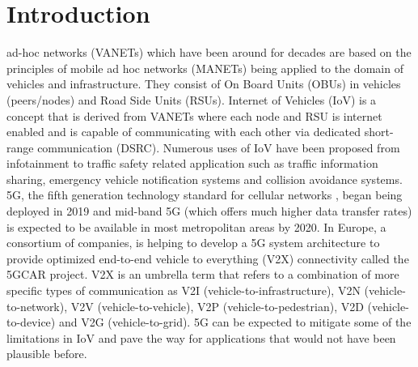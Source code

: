 \documentclass[journal]{IEEEtran}
\begin{document}
%
\IEEEpeerreviewmaketitle



\section{Introduction}

% 
% 
% 
% 
 ad-hoc networks (VANETs) which have been around for decades are based on the principles of mobile ad hoc networks (MANETs) being applied to the domain of vehicles and infrastructure. They consist of On Board Units (OBUs) in vehicles (peers/nodes) and Road Side Units (RSUs). Internet of Vehicles (IoV) is a concept that is derived from VANETs where each node and RSU is internet enabled and is capable of communicating with each other via dedicated short-range communication (DSRC). Numerous uses of IoV have been proposed from infotainment to traffic safety related application such as traffic information sharing, emergency vehicle notification systems and collision avoidance systems.
\\5G, the fifth generation technology standard for cellular networks \cite{c:INTERNET_5garticle}, began being deployed in 2019 and mid-band 5G (which offers much higher data transfer rates) is expected to be available in most metropolitan areas by 2020. In Europe, a consortium of companies, is helping to develop a 5G system architecture to provide optimized end-to-end vehicle to everything (V2X) connectivity called the 5GCAR project.
V2X is an umbrella term that refers to a combination of more specific types of communication as V2I (vehicle-to-infrastructure), V2N (vehicle-to-network), V2V (vehicle-to-vehicle), V2P (vehicle-to-pedestrian), V2D (vehicle-to-device) and V2G (vehicle-to-grid). 5G can be expected to mitigate some of the limitations in IoV and pave the way for applications that would not have been plausible before.
\end{document}
